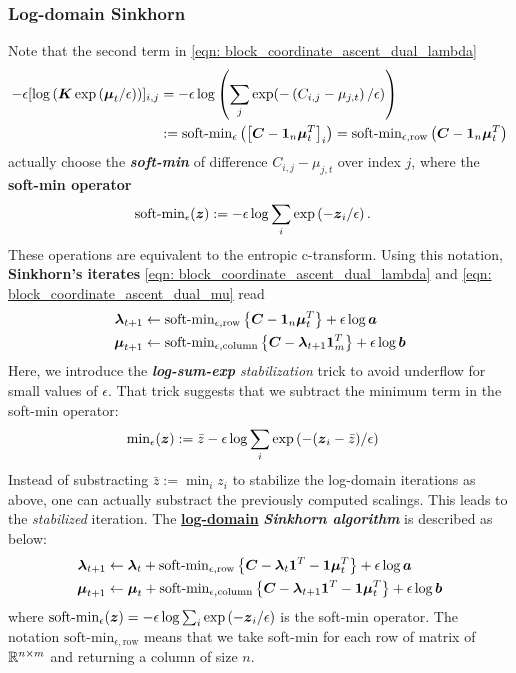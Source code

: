 \documentclass[11pt]{article}
\begin{document}
\subsubsection{Log-domain Sinkhorn}
Note that the second term in \eqref{eqn: block_coordinate_ascent_dual_lambda}
\begin{align*}
 -\epsilon[\log\left(\boldsymbol{K}\exp\left(\boldsymbol{\mu}_{t}/\epsilon\right)\right)]_{i,j} &= -\epsilon\log\left(\sum_{j}\exp(-\left(C_{i,j} -  \mu_{j, t}\right)/\epsilon)\right) \\
 &:= \text{soft-min}_{\epsilon}\left(\left[\boldsymbol{C} -  \boldsymbol{1}_{n}\boldsymbol{\mu}_{t}^{T}\right]_{i}\right) = \text{soft-min}_{\epsilon, \text{row}}\left(\boldsymbol{C} -  \boldsymbol{1}_{n}\boldsymbol{\mu}_{t}^{T}\right)
\end{align*} actually choose the \emph{\textbf{soft-min}} of difference $C_{i,j} - \mu_{j, t}$ over index $j$, where the \textbf{soft-min operator}
\begin{align*}
\text{soft-min}_{\epsilon}(\boldsymbol{z}) &:= -\epsilon \log \sum_{i}\exp\left(-\boldsymbol{z}_i/\epsilon\right).
\end{align*} These operations are equivalent to the entropic c-transform. 
Using this notation, \textbf{Sinkhorn’s iterates} \eqref{eqn: block_coordinate_ascent_dual_lambda} and \eqref{eqn: block_coordinate_ascent_dual_mu} read 
\begin{align}
\boldsymbol{\lambda}_{t+1} &\leftarrow  \text{soft-min}_{\epsilon, \text{row}}\left\{\boldsymbol{C} -\boldsymbol{1}_{n}\boldsymbol{\mu}_{t}^{T}\right\} +  \epsilon\log \boldsymbol{a} \\
\boldsymbol{\mu}_{t+1} &\leftarrow  \text{soft-min}_{\epsilon, \text{column}}\left\{\boldsymbol{C} - \boldsymbol{\lambda}_{t+1}\boldsymbol{1}_{m}^{T}\right\} + \epsilon \log \boldsymbol{b} 
\end{align} Here, we introduce the \emph{\textbf{log-sum-exp} stabilization} trick to avoid underflow for small values of $\epsilon$. That trick suggests that we subtract the minimum term in the soft-min operator:
\begin{align*}
\text{min}_{\epsilon}(\boldsymbol{z}) &:= \bar{z} -\epsilon \log \sum_{i}\exp\left(-(\boldsymbol{z}_i -   \bar{z})/\epsilon\right)
\end{align*} Instead of substracting $ \bar{z}:=\min_{i}z_{i}$ to stabilize the log-domain iterations as above, one can actually substract the previously computed scalings. This leads to the \emph{stabilized} iteration. The \underline{\textbf{log-domain}} \textbf{\emph{Sinkhorn algorithm}} is described as below:
\begin{align}
\boldsymbol{\lambda}_{t+1} &\leftarrow  \boldsymbol{\lambda}_{t} + \text{soft-min}_{\epsilon, \text{row}}\left\{\boldsymbol{C}- \boldsymbol{\lambda}_{t}\boldsymbol{1}^{T} - \boldsymbol{1}\boldsymbol{\mu}_{t}^{T} \right\} +  \epsilon\log \boldsymbol{a} \label{eqn: log_domain_dual_sinkhorn_lambda}\\
\boldsymbol{\mu}_{t+1} &\leftarrow \boldsymbol{\mu}_{t} +  \text{soft-min}_{\epsilon, \text{column}}\left\{\boldsymbol{C} - \boldsymbol{\lambda}_{t+1}\boldsymbol{1}^{T}- \boldsymbol{1}\boldsymbol{\mu}_{t}^{T}\right\} + \epsilon \log \boldsymbol{b} \label{eqn: log_domain_dual_sinkhorn_mu}
\end{align} where $\text{soft-min}_{\epsilon}(\boldsymbol{z}) = -\epsilon \log \sum_{i}\exp\left(-\boldsymbol{z}_i/\epsilon\right)$ is the soft-min operator. The notation $\text{soft-min}_{\epsilon, \text{row}}$ means that we take soft-min for each row of matrix of ${\mathbb R}^{n\times m}$ and returning a column of size $n$. 
\end{document}
